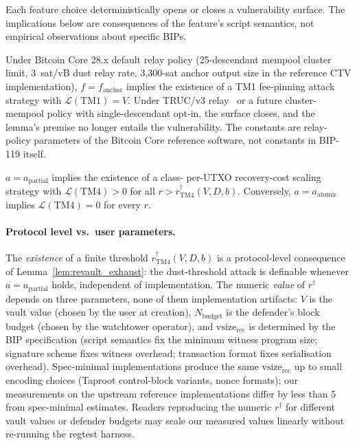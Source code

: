 Each feature choice deterministically opens or closes a vulnerability
surface. The implications below are consequences of the feature's
script semantics, not empirical observations about specific BIPs.

\begin{lemma}\label{lem:anchor_pinning}
Under Bitcoin Core 28.x default relay policy (25-descendant mempool
cluster limit, 3~sat/vB dust relay rate, 3{,}300-sat anchor output
size in the reference CTV implementation), $f = f_{\text{anchor}}$
implies the existence of a TM1 fee-pinning attack strategy with
$\mathcal{L}(\mathrm{TM1}) = V$. Under TRUC/v3 relay~\cite{CoreRelay}
or a future cluster-mempool policy with single-descendant opt-in,
the surface closes, and the lemma's premise no longer entails the
vulnerability. The constants are relay-policy parameters of the
Bitcoin Core reference software, not constants in BIP-119 itself.
\end{lemma}

\begin{lemma}\label{lem:revault_exhaust}
$a = a_{\text{partial}}$ implies the existence of a class-\classscale{}
per-UTXO recovery-cost scaling strategy with $\mathcal{L}(\mathrm{TM4}) > 0$ for
all $r > r^\dagger_{\mathrm{TM4}}(V, D, b)$.
Conversely, $a = a_{\text{atomic}}$ implies $\mathcal{L}(\mathrm{TM4}) = 0$
for every $r$.
\end{lemma}

\paragraph{Protocol level vs.\ user parameters.}
The \emph{existence} of a finite threshold
$r^\dagger_{\mathrm{TM4}}(V, D, b)$ is a protocol-level consequence
of Lemma~\ref{lem:revault_exhaust}: the dust-threshold attack is
definable whenever $a = a_{\text{partial}}$ holds, independent of
implementation. The numeric \emph{value} of $r^\dagger$ depends on
three parameters, none of them implementation artifacts:
$V$ is the vault value (chosen by the user at creation),
$N_{\text{budget}}$ is the defender's block budget (chosen by the
watchtower operator), and $\text{vsize}_{\text{rec}}$ is determined
by the BIP specification (script semantics fix the minimum witness
program size; signature scheme fixes witness overhead; transaction
format fixes serialisation overhead). Spec-minimal implementations
produce the same $\text{vsize}_{\text{rec}}$ up to small encoding
choices (Taproot control-block variants, nonce formats); our
measurements on the upstream reference implementations differ by
less than 5\vB{} from spec-minimal estimates. Readers reproducing
the numeric $r^\dagger$ for different vault values or defender
budgets may scale our measured values linearly without re-running
the regtest harness.


